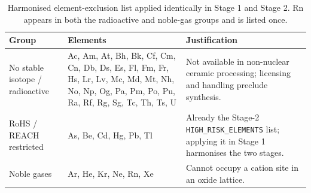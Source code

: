 \begin{table}[htbp]
\centering
\footnotesize
\setlength{\tabcolsep}{3pt}
\caption{Harmonised element-exclusion list applied identically in Stage 1 and Stage 2. Rn appears in both the radioactive and noble-gas groups and is listed once.}
\label{tab:a1_exclusions}
\begin{tabular}{p{}p{}p{}}
\toprule
Group & Elements & Justification \\
\midrule
No stable isotope / radioactive & Ac, Am, At, Bh, Bk, Cf, Cm, Cn, Db, Ds, Es, Fl, Fm, Fr, Hs, Lr, Lv, Mc, Md, Mt, Nh, No, Np, Og, Pa, Pm, Po, Pu, Ra, Rf, Rg, Sg, Tc, Th, Ts, U & Not available in non-nuclear ceramic processing; licensing and handling preclude synthesis. \\
RoHS / REACH restricted & As, Be, Cd, Hg, Pb, Tl & Already the Stage-2 \texttt{HIGH\_RISK\_ELEMENTS} list; applying it in Stage 1 harmonises the two stages. \\
Noble gases & Ar, He, Kr, Ne, Rn, Xe & Cannot occupy a cation site in an oxide lattice. \\
\bottomrule
\end{tabular}
\end{table}

